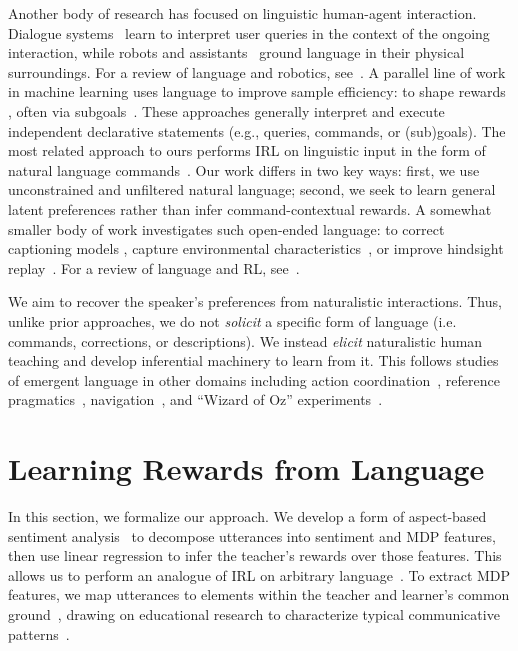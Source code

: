 \documentclass[letterpaper]{article} %
\begin{document}
Another body of research has focused on linguistic human-agent interaction. Dialogue systems~\citep{artzi_2011_bootstrapping, li2016dialogue} learn to interpret user queries in the context of the ongoing interaction, while robots and assistants~\cite{thomason_2015, wang_2019_navigation, thomason_2020, szlam2019build} ground language in their physical surroundings. For a review of language and robotics, see~\citet{Tellex2020}. A parallel line of work in machine learning uses language to improve sample efficiency: to shape rewards \citep{maclin_1994, kuhlman_2004}, often via subgoals~\citep{kaplan_atari, tellex_2018_rewards, chevalier_boisvert_2018, goyal2019using, Bahdanau_2019, zhou2020inverse}. These approaches generally interpret and execute independent declarative statements (e.g., queries, commands, or (sub)goals). The most related approach to ours  performs IRL on linguistic input in the form of natural language commands~\citep{macglashan2015grounding, fu_2019_goals, goyal2020pixl2r}.
Our work differs in two key ways: first, we use unconstrained and unfiltered natural language; second, we seek to learn general latent preferences rather than infer command-contextual rewards. A somewhat smaller body of work investigates such open-ended language: to correct captioning models \cite{Ling2017_captions}, capture environmental characteristics~\citep{narasimhan2018grounding}, or improve hindsight replay~\citep{cideron2019selfeducated}. For a review of language and RL, see~\citet{luketina2019survey}.

We aim to recover the speaker's preferences from naturalistic interactions. Thus, unlike prior approaches, we do not \textit{solicit} a specific form of language (i.e. commands, corrections, or descriptions). We instead \textit{elicit} naturalistic human teaching and develop inferential machinery to learn from it. This follows studies of emergent language in other domains including action coordination~\citep{Djalali2011, Djalali_2012, potts_2012, ilinykh2019meetup, Suhr_2019}, reference pragmatics~\citep{He_2017, Udagawa_2019}, navigation~\citep{thomason2019visionanddialog}, and ``Wizard of Oz'' experiments~\citep{kim2009people, fraser2018_natural_language_agent}.

\section{Learning Rewards from Language}
\label{overall_rewards_from_language_section}
In this section, we formalize our approach. We develop a form of aspect-based sentiment analysis~\cite{hu2004mining, liu2020sentiment} to decompose utterances into sentiment and MDP features, then use linear regression to infer the teacher's rewards over those features. This allows us to perform an analogue of IRL on arbitrary language~\cite{abbeel2004apprenticeship}. To extract MDP features, we map utterances to elements within the teacher and learner's common ground~\cite{harnad1990symbol, clark1996using, mooney2008learning}, drawing on educational research to characterize typical communicative patterns~\citep{shute_2008, Lipnevich_education}.
\end{document}
